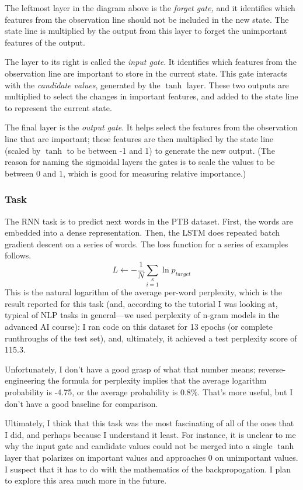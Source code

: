 \documentclass{journal}
\begin{document}
The leftmost layer in the diagram above is the \emph{forget gate,}
and it identifies which features from the observation line should not be
included in the new state. The state line is multiplied by the output
from this layer to forget the unimportant features of the output.

The layer to its right is called the \emph{input gate}. It identifies
which features from the observation line are important to store in the current
state. This gate interacts with the \emph{candidate values}, generated by
the $\tanh{}$ layer. These two outputs are multiplied to select the changes in
important features, and added to the state line to represent the current state.

The final layer is the \emph{output gate}. It helps select the features from
the observation line that are important; these features are then multiplied by
the state line (scaled by $\tanh{}$ to be between -1 and 1) to generate the new
output. (The reason for naming the sigmoidal layers the gates is to scale the
values to be between 0 and 1, which is good for measuring relative importance.)

\subsubsection{Task}
The RNN task is to predict next words in the PTB dataset. First, the words
are embedded into a dense representation. Then, the LSTM does repeated batch
gradient descent on a series of words. The loss function for a series of
examples follows.
$$L \leftarrow{} {-\frac{1}{N}\sum\limits_{i=1}\limits^{N}\ln{p_{target}}}$$
This is the natural logarithm of the average per-word perplexity, which is the
result reported for this task (and, according to the tutorial I was looking at,
typical of NLP tasks in general---we used perplexity of n-gram models in
the advanced AI course): I ran code on this dataset for 13 epochs
(or complete runthroughs of the test set), and, ultimately, it achieved a test
perplexity score of 115.3.

Unfortunately, I don't have a good grasp of what that number means;
reverse-engineering the formula for perplexity implies that the
average logarithm probability is -4.75, or the average probability is $0.8\%$.
That's more useful, but I don't have a good baseline for comparison.

Ultimately, I think that this task was the most fascinating of all of the ones
that I did, and perhaps because I understand it least. For instance, it is
unclear to me why the input gate and candidate values could not be merged into
a single $\tanh{}$ layer that polarizes on important values and approaches 0 on
unimportant values. I suspect that it has to do with the mathematics of the
backpropogation. I plan to explore this area much more in the future.
\end{document}
